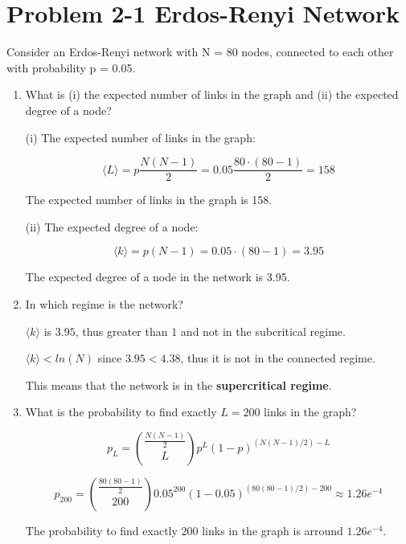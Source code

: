 \section{Problem 2-1 Erdos-Renyi Network}

Consider an Erdos-Renyi network with N = 80 nodes, connected to each other with probability p = 0.05.

\begin{enumerate}
	\item What is (i) the expected number of links in the graph and (ii) the expected degree of a node?
	
	(i) The expected number of links in the graph:
	
	\begin{equation*}
	\langle L \rangle = p \frac{N(N-1)}{2} = 0.05 \frac{80 \cdot (80 - 1)}{2} = 158
	\end{equation*}
	
	The expected number of links in the graph is 158.
	
	(ii) The expected degree of a node:
	
	\begin{equation*}
	\langle k \rangle = p(N-1) = 0.05 \cdot (80 -1) = 3.95
	\end{equation*}
	
	The expected degree of a node in the network is 3.95.
	
	\item In which regime is the network?
	
	$\langle k \rangle$ is $3.95$,  thus greater than $1$ and not in the subcritical regime.
	
	$\langle k \rangle < ln(N)$ since $3.95 < 4.38$,  thus it is not in the connected regime.
	
	This means that the network is in the \textbf{supercritical regime}.
	
	\item What is the probability to find exactly $L = 200$ links in the graph?
	
	\begin{equation*}
		p_L = {{\frac{N(N-1)}{2}} \choose {L}} p^L (1-p)^{(N(N-1)/2)-L}
	\end{equation*}
	
	\begin{equation*}
		p_{200} = {{\frac{80(80-1)}{2}} \choose {200}} 0.05^{200} (1-0.05)^{(80(80-1)/2)-200} \approx 1.26e^{-4}
	\end{equation*}
	
	The probability to find exactly 200 links in the graph is arround $1.26e^{-4}$.
	

\end{enumerate}
